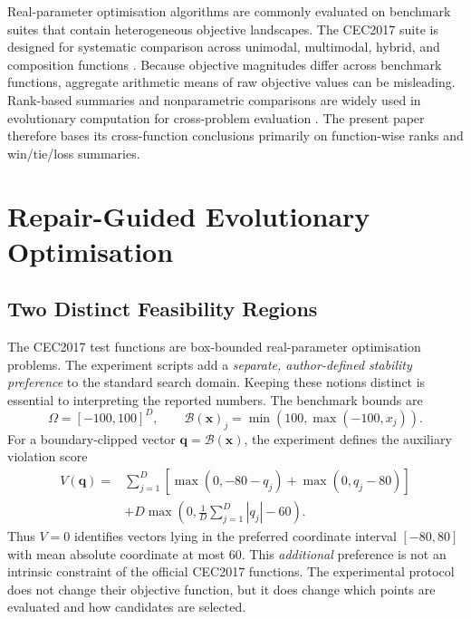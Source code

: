 \documentclass[journal]{IEEEtran}
\begin{document}
Real-parameter optimisation algorithms are commonly evaluated on benchmark suites that contain heterogeneous objective landscapes. The CEC2017 suite is designed for systematic comparison across unimodal, multimodal, hybrid, and composition functions \cite{awad2017cec}. Because objective magnitudes differ across benchmark functions, aggregate arithmetic means of raw objective values can be misleading. Rank-based summaries and nonparametric comparisons are widely used in evolutionary computation for cross-problem evaluation \cite{garcia2009nonparametric,derrac2011tutorial}. The present paper therefore bases its cross-function conclusions primarily on function-wise ranks and win/tie/loss summaries.

\section{Repair-Guided Evolutionary Optimisation}
\label{sec:method}

\subsection{Two Distinct Feasibility Regions}

The CEC2017 test functions are box-bounded real-parameter optimisation problems. The experiment scripts add a \emph{separate, author-defined stability preference} to the standard search domain. Keeping these notions distinct is essential to interpreting the reported numbers. The benchmark bounds are
\begin{equation}
\Omega=[-100,100]^D, \qquad
\mathcal{B}(\mathbf{x})_j=\min(100,\max(-100,x_j)).
\label{eq:clip}
\end{equation}
For a boundary-clipped vector $\mathbf{q}=\mathcal{B}(\mathbf{x})$, the experiment defines the auxiliary violation score
\begin{equation}
\begin{split}
V(\mathbf{q})={}&\sum_{j=1}^{D}
\left[\max(0,-80-q_j)+\max(0,q_j-80)\right]\\
&+D\max\left(0,\frac{1}{D}\sum_{j=1}^{D}|q_j|-60\right).
\end{split}
\label{eq:violation}
\end{equation}
Thus $V=0$ identifies vectors lying in the preferred coordinate interval $[-80,80]$ with mean absolute coordinate at most 60. This \emph{additional} preference is not an intrinsic constraint of the official CEC2017 functions. The experimental protocol does not change their objective function, but it does change which points are evaluated and how candidates are selected.
\end{document}
